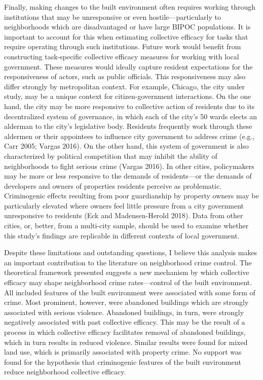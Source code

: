 \documentclass [11pt, proquest] {uwthesis}[2015/03/03]
\begin{document}
Finally, making changes to the built environment often requires working through institutions that may be unresponsive or even hostile---particularly to neighborhoods which are disadvantaged or have large BIPOC populations. It is important to account for this when estimating collective efficacy for tasks that require operating through such institutions. Future work would benefit from constructing task-specific collective efficacy measures for working with local government. These measures would ideally capture resident expectations for the responsiveness of actors, such as public officials. This responsiveness may also differ strongly by metropolitan context. For example, Chicago, the city under study, may be a unique context for citizen-government interactions. On the one hand, the city may be more responsive to collective action of residents due to its decentralized system of governance, in which each of the city's 50 wards elects an alderman to the city's legislative body. Residents frequently work through these aldermen or their appointees to influence city government to address crime (e.g., Carr 2005; Vargas 2016). On the other hand, this system of government is also characterized by political competition that may inhibit the ability of neighborhoods to fight serious crime (Vargas 2016). In other cities, policymakers may be more or less responsive to the demands of residents---or the demands of developers and owners of properties residents perceive as problematic. Criminogenic effects resulting from poor guardianship by property owners may be particularly elevated where owners feel little pressure from a city government unresponsive to residents (Eck and Madensen-Herold 2018). Data from other cities, or, better, from a multi-city sample, should be used to examine whether this study's findings are replicable in different contexts of local government.

Despite these limitations and outstanding questions, I believe this analysis makes an important contribution to the literature on neighborhood crime control. The theoretical framework presented suggests a new mechanism by which collective efficacy may shape neighborhood crime rates---control of the built environment. All included features of the built environment were associated with some form of crime. Most prominent, however, were abandoned buildings which are strongly associated with serious violence. Abandoned buildings, in turn, were strongly negatively associated with past collective efficacy. This may be the result of a process in which collective efficacy facilitates removal of abandoned buildings, which in turn results in reduced violence. Similar results were found for mixed land use, which is primarily associated with property crime. No support was found for the hypothesis that criminogenic features of the built environment reduce neighborhood collective efficacy.
\end{document}
